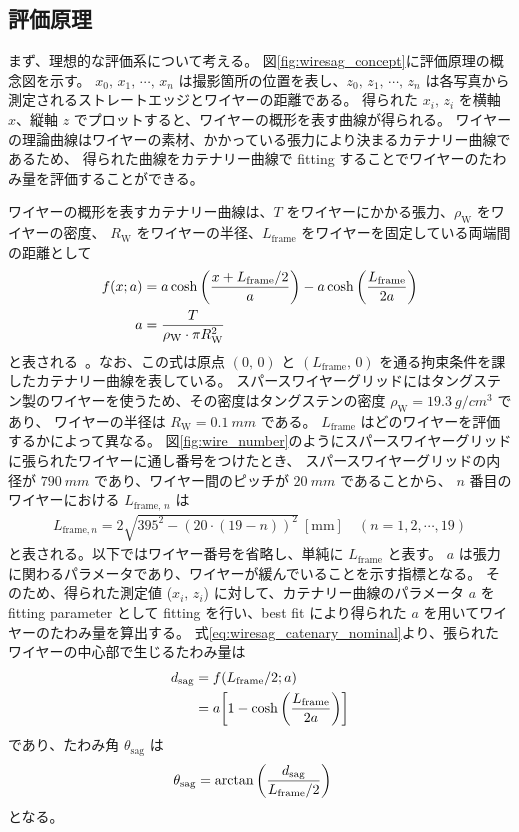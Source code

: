 \documentclass[../../main.tex]{subfiles}
\begin{document}
\subsection{評価原理}
\label{subsec:wiresag_principle}
まず、理想的な評価系について考える。
図\ref{fig:wiresag_concept}に評価原理の概念図を示す。
$x_{0},\,x_{1},\,\cdots,\,x_{n}$ は撮影箇所の位置を表し、$z_{0},\,z_{1},\,\cdots,\,z_{n}$ は各写真から測定されるストレートエッジとワイヤーの距離である。
得られた $x_{i},\,z_{i}$ を横軸 $x$、縦軸 $z$ でプロットすると、ワイヤーの概形を表す曲線が得られる。
ワイヤーの理論曲線はワイヤーの素材、かかっている張力により決まるカテナリー曲線であるため、
得られた曲線をカテナリー曲線で fitting することでワイヤーのたわみ量を評価することができる。

ワイヤーの概形を表すカテナリー曲線は、$T$ をワイヤーにかかる張力、$\rho_{\mathrm{W}}$ をワイヤーの密度、
$R_{\mathrm{W}}$ をワイヤーの半径、$L_{\mathrm{frame}}$ をワイヤーを固定している両端間の距離として
\begin{align}
    \label{eq:wiresag_catenary_nominal}
    f(x;a) &= a\cosh\qty(\dfrac{x+L_{\mathrm{frame}}/2}{a}) - a\cosh\qty(\dfrac{L_{\mathrm{frame}}}{2a}) \\
    a &= \dfrac{T}{\rho_{\mathrm{W}}\cdot\pi R_{\mathrm{W}}^2}
\end{align}
と表される~\cite{swg:murata}。なお、この式は原点 $(0,\,0)$ と $(L_{\mathrm{frame}},\,0)$ を通る拘束条件を課したカテナリー曲線を表している。
スパースワイヤーグリッドにはタングステン製のワイヤーを使うため、その密度はタングステンの密度 $\rho_{\mathrm{W}}=\SI{19.3}{g/cm^3}$ であり、
ワイヤーの半径は $R_{\mathrm{W}}=\SI{0.1}{mm}$ である。
$L_{\mathrm{frame}}$ はどのワイヤーを評価するかによって異なる。
図\ref{fig:wire_number}のようにスパースワイヤーグリッドに張られたワイヤーに通し番号をつけたとき、
スパースワイヤーグリッドの内径が $\SI{790}{mm}$ であり、ワイヤー間のピッチが $\SI{20}{mm}$ であることから、
$n$ 番目のワイヤーにおける $L_{\mathrm{frame},\,n}$ は
\begin{align}
    \label{eq:wiresag_frame_length}
    L_{\mathrm{frame}, n} = 2\sqrt{395^2-(20\cdot(19-n))^2}\ [\mathrm{mm}] \quad (n=1,2,\cdots,19)
\end{align}
と表される。以下ではワイヤー番号を省略し、単純に $L_{\mathrm{frame}}$ と表す。
$a$ は張力に関わるパラメータであり、ワイヤーが緩んでいることを示す指標となる。
そのため、得られた測定値 ($x_{i},\,z_{i}$) に対して、カテナリー曲線のパラメータ $a$ を fitting parameter として
fitting を行い、best fit により得られた $a$ を用いてワイヤーのたわみ量を算出する。
式\eqref{eq:wiresag_catenary_nominal}より、張られたワイヤーの中心部で生じるたわみ量は
\begin{align}
    d_{\mathrm{sag}} &= f(L_{\mathrm{frame}}/2;a) \\
    \label{eq:wiresag_sag}
                     &= a\qty[1-\cosh\qty(\dfrac{L_{\mathrm{frame}}}{2a})]
\end{align}
であり、たわみ角 $\theta_{\mathrm{sag}}$ は
\begin{align}
    \label{eq:wiresag_sag_angle}
    \theta_{\mathrm{sag}} &= \arctan\qty(\dfrac{d_{\mathrm{sag}}}{L_{\mathrm{frame}}/2})
\end{align}
となる。
\end{document}
